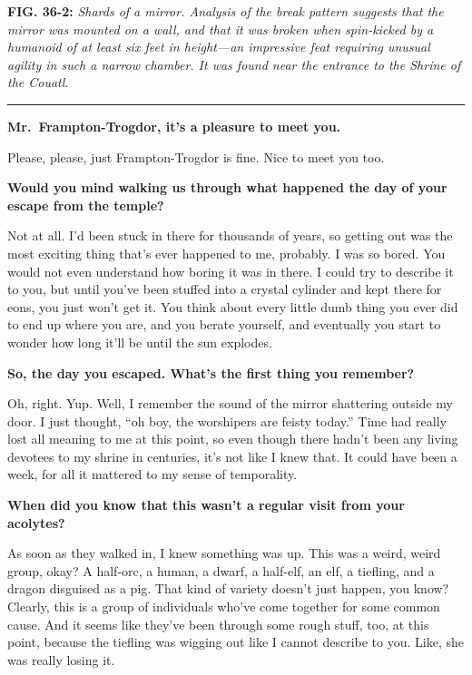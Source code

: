 \documentclass[smalldemyvopaper,11pt,twoside,onecolumn,openright,extrafontsizes]{memoir}
\begin{document}
\textbf{FIG. 36-2:} \emph{Shards of a mirror. Analysis of the break
pattern suggests that the mirror was mounted on a wall, and that it was
broken when spin-kicked by a humanoid of at least six feet in
height---an impressive feat requiring unusual agility in such a narrow
chamber. It was found near the entrance to the Shrine of the Couatl.}

\begin{center}\rule{0.5\linewidth}{\linethickness}\end{center}

\textbf{Mr.~Frampton-Trogdor, it's a pleasure to meet you.}

Please, please, just Frampton-Trogdor is fine. Nice to meet you too.

\textbf{Would you mind walking us through what happened the day of your
escape from the temple?}

Not at all. I'd been stuck in there for thousands of years, so getting
out was the most exciting thing that's ever happened to me, probably. I
was so bored. You would not even understand how boring it was in there.
I could try to describe it to you, but until you've been stuffed into a
crystal cylinder and kept there for eons, you just won't get it. You
think about every little dumb thing you ever did to end up where you
are, and you berate yourself, and eventually you start to wonder how
long it'll be until the sun explodes.

\textbf{So, the day you escaped. What's the first thing you remember?}

Oh, right. Yup. Well, I remember the sound of the mirror shattering
outside my door. I just thought, ``oh boy, the worshipers are feisty
today.'' Time had really lost all meaning to me at this point, so even
though there hadn't been any living devotees to my shrine in centuries,
it's not like I knew that. It could have been a week, for all it
mattered to my sense of temporality.

\textbf{When did you know that this wasn't a regular visit from your
acolytes?}

As soon as they walked in, I knew something was up. This was a weird,
weird group, okay? A half-orc, a human, a dwarf, a half-elf, an elf, a
tiefling, and a dragon disguised as a pig. That kind of variety doesn't
just happen, you know? Clearly, this is a group of individuals who've
come together for some common cause. And it seems like they've been
through some rough stuff, too, at this point, because the tiefling was
wigging out like I cannot describe to you. Like, she was really losing
it.
\end{document}
